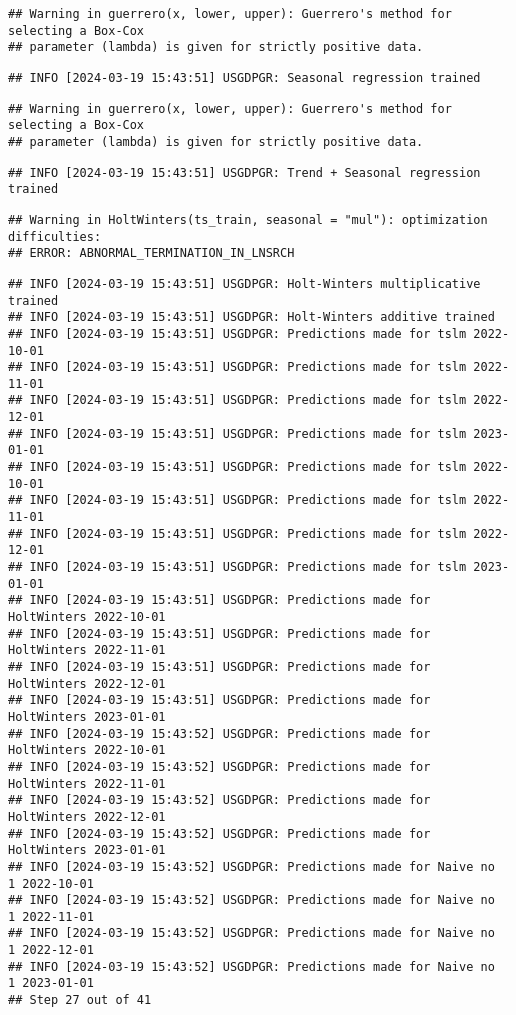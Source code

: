 \documentclass[
]{article}
\begin{document}
\begin{verbatim}
## Warning in guerrero(x, lower, upper): Guerrero's method for selecting a Box-Cox
## parameter (lambda) is given for strictly positive data.
\end{verbatim}

\begin{verbatim}
## INFO [2024-03-19 15:43:51] USGDPGR: Seasonal regression trained
\end{verbatim}

\begin{verbatim}
## Warning in guerrero(x, lower, upper): Guerrero's method for selecting a Box-Cox
## parameter (lambda) is given for strictly positive data.
\end{verbatim}

\begin{verbatim}
## INFO [2024-03-19 15:43:51] USGDPGR: Trend + Seasonal regression trained
\end{verbatim}

\begin{verbatim}
## Warning in HoltWinters(ts_train, seasonal = "mul"): optimization difficulties:
## ERROR: ABNORMAL_TERMINATION_IN_LNSRCH
\end{verbatim}

\begin{verbatim}
## INFO [2024-03-19 15:43:51] USGDPGR: Holt-Winters multiplicative trained
## INFO [2024-03-19 15:43:51] USGDPGR: Holt-Winters additive trained
## INFO [2024-03-19 15:43:51] USGDPGR: Predictions made for tslm 2022-10-01
## INFO [2024-03-19 15:43:51] USGDPGR: Predictions made for tslm 2022-11-01
## INFO [2024-03-19 15:43:51] USGDPGR: Predictions made for tslm 2022-12-01
## INFO [2024-03-19 15:43:51] USGDPGR: Predictions made for tslm 2023-01-01
## INFO [2024-03-19 15:43:51] USGDPGR: Predictions made for tslm 2022-10-01
## INFO [2024-03-19 15:43:51] USGDPGR: Predictions made for tslm 2022-11-01
## INFO [2024-03-19 15:43:51] USGDPGR: Predictions made for tslm 2022-12-01
## INFO [2024-03-19 15:43:51] USGDPGR: Predictions made for tslm 2023-01-01
## INFO [2024-03-19 15:43:51] USGDPGR: Predictions made for HoltWinters 2022-10-01
## INFO [2024-03-19 15:43:51] USGDPGR: Predictions made for HoltWinters 2022-11-01
## INFO [2024-03-19 15:43:51] USGDPGR: Predictions made for HoltWinters 2022-12-01
## INFO [2024-03-19 15:43:51] USGDPGR: Predictions made for HoltWinters 2023-01-01
## INFO [2024-03-19 15:43:52] USGDPGR: Predictions made for HoltWinters 2022-10-01
## INFO [2024-03-19 15:43:52] USGDPGR: Predictions made for HoltWinters 2022-11-01
## INFO [2024-03-19 15:43:52] USGDPGR: Predictions made for HoltWinters 2022-12-01
## INFO [2024-03-19 15:43:52] USGDPGR: Predictions made for HoltWinters 2023-01-01
## INFO [2024-03-19 15:43:52] USGDPGR: Predictions made for Naive no  1 2022-10-01
## INFO [2024-03-19 15:43:52] USGDPGR: Predictions made for Naive no  1 2022-11-01
## INFO [2024-03-19 15:43:52] USGDPGR: Predictions made for Naive no  1 2022-12-01
## INFO [2024-03-19 15:43:52] USGDPGR: Predictions made for Naive no  1 2023-01-01
## Step 27 out of 41
\end{verbatim}
\end{document}
